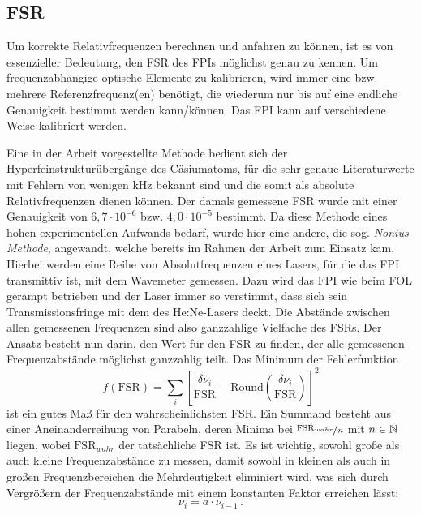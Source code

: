 \subsection{FSR}\label{subsec:FSR-messung}
Um korrekte Relativfrequenzen berechnen und anfahren zu
können, ist es von essenzieller Bedeutung, den FSR des FPIs möglichst genau zu
kennen. Um frequenzabhängige optische Elemente zu kalibrieren, wird immer eine bzw. mehrere
Referenzfrequenz(en) benötigt, die wiederum nur bis auf eine endliche
Genauigkeit bestimmt werden kann/können. Das FPI kann auf verschiedene
Weise kalibriert werden.\par
Eine in der Arbeit \cite{kuschnick:2000:diplomarbeit}
vorgestellte Methode bedient sich der Hyperfeinstrukturübergänge des
Cäsiumatoms, für die sehr genaue Literaturwerte mit Fehlern von wenigen kHz \cite{PhysRevA.38.1616} bekannt sind
und die somit als absolute Relativfrequenzen dienen können. Der damals gemessene
FSR wurde mit einer Genauigkeit von $6,7\cdot10^{-6}$ bzw. $4,0\cdot10^{-5}$ bestimmt. Da
diese Methode eines hohen experimentellen Aufwands bedarf, wurde hier
eine andere, die sog. \textit{Nonius-Methode}, angewandt, welche bereits im
Rahmen der Arbeit \cite{schumann:2005:dissertation} zum Einsatz kam. Hierbei werden eine
Reihe von Absolutfrequenzen eines Lasers, für die das
FPI transmittiv ist, mit dem Wavemeter gemessen. Dazu wird das FPI wie beim FOL
gerampt betrieben und der Laser immer so verstimmt, dass sich sein
Transmissionsfringe mit dem des He:Ne-Lasers deckt. Die Abstände zwischen allen
gemessenen Frequenzen sind also ganzzahlige
Vielfache des FSRs. Der Ansatz besteht nun darin, den Wert für den FSR zu
finden, der alle gemessenen Frequenzabstände möglichst ganzzahlig teilt. Das Minimum der Fehlerfunktion
\begin{equation}\label{eq:nonius}
	f(\text{FSR})=\sum\limits_i\left[\frac{\delta\nu_i}{\text{FSR}}-\text{Round}\left(\frac{\delta\nu_i}{\text{FSR}}\right)\right]^2
\end{equation}
ist ein gutes Maß für den wahrscheinlichsten FSR.
Ein Summand besteht aus einer Aneinanderreihung von Parabeln, deren Minima bei
$\nicefrac{\text{FSR}_{wahr}}{n}$ mit $n\in\mathbb{N}$ liegen, wobei $\text{FSR}_{wahr}$
der tatsächliche FSR ist. Es ist wichtig, sowohl große als auch kleine
Frequenzabstände zu messen, damit sowohl in kleinen als auch in großen
Frequenzbereichen die Mehrdeutigkeit eliminiert wird, was sich durch Vergrößern
der Frequenzabstände mit einem konstanten Faktor erreichen lässt:
\begin{equation}\label{eq:nonius_faktor}
	\nu_i=a\cdot\nu_{i-1}\,.
\end{equation}
